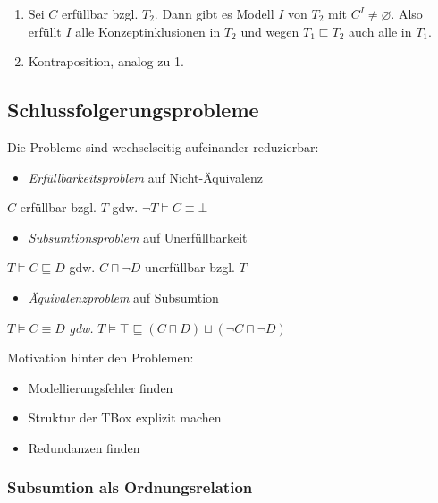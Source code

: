 \begin{enumerate}
\def\labelenumi{\arabic{enumi}.}
\item
  Sei $C$ erfüllbar bzgl. $T_{2}$. Dann gibt es Modell $I$ von
  $T_{2}$ mit $C^{I} \neq \varnothing$. Also erfüllt $I$ alle
  Konzeptinklusionen in $T_{2}$ und wegen $T_{1} \sqsubseteq T_{2}$
  auch alle in $T_{1}$.
\item
  Kontraposition, analog zu 1.
\end{enumerate}

\subsection{Schlussfolgerungsprobleme}\label{schlussfolgerungsprobleme}

Die Probleme sind wechselseitig aufeinander reduzierbar:

\begin{itemize}
\item
  \emph{Erfüllbarkeitsproblem} auf Nicht-Äquivalenz
\end{itemize}

$C$ erfüllbar bzgl. $T$ gdw. $\neg T \vDash C \equiv \bot$

\begin{itemize}
\item
  \emph{Subsumtionsproblem} auf Unerfüllbarkeit
\end{itemize}

$T \vDash C \sqsubseteq D$ gdw. $C \sqcap \neg D$ unerfüllbar bzgl.
$T$

\begin{itemize}
\item
  \emph{Äquivalenzproblem} auf Subsumtion
\end{itemize}

$T \vDash C \equiv D$ \emph{gdw.}
$T \vDash \top \sqsubseteq \left( C \sqcap D \right) \sqcup \left( \neg C \sqcap \neg D \right)$

Motivation hinter den Problemen:

\begin{itemize}
\item
  Modellierungsfehler finden
\item
  Struktur der TBox explizit machen
\item
  Redundanzen finden
\end{itemize}

\subsubsection{Subsumtion als
Ordnungsrelation}\label{subsumtion-als-ordnungsrelation}

